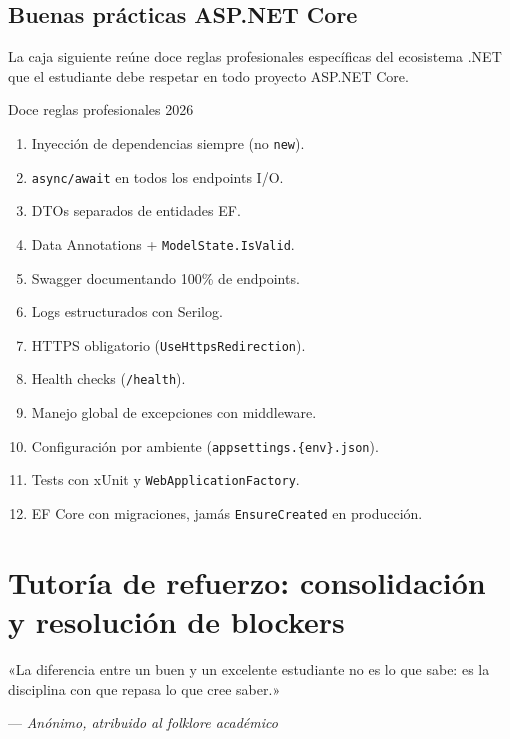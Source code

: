 \documentclass[11pt,a4paper,openany]{book}
\begin{document}
\section{Buenas prácticas ASP.NET Core}

La caja siguiente reúne doce reglas profesionales específicas
del ecosistema .NET que el estudiante debe respetar en todo
proyecto ASP.NET Core.


\begin{cajabuenas}{Doce reglas profesionales 2026}
\begin{enumerate}
\item Inyección de dependencias siempre (no \texttt{new}).
\item \texttt{async/await} en todos los endpoints I/O.
\item DTOs separados de entidades EF.
\item Data Annotations + \texttt{ModelState.IsValid}.
\item Swagger documentando 100\% de endpoints.
\item Logs estructurados con Serilog.
\item HTTPS obligatorio (\texttt{UseHttpsRedirection}).
\item Health checks (\texttt{/health}).
\item Manejo global de excepciones con middleware.
\item Configuración por ambiente (\texttt{appsettings.\{env\}.json}).
\item Tests con xUnit y \texttt{WebApplicationFactory}.
\item EF Core con migraciones, jamás
\texttt{EnsureCreated} en producción.
\end{enumerate}
\end{cajabuenas}


\chapter{Tutoría de refuerzo: consolidación y resolución de blockers}
\label{cap:semana8}

\epigraph{«La diferencia entre un buen y un excelente estudiante no
es lo que sabe: es la disciplina con que repasa lo que cree saber.»}
{--- \textit{Anónimo, atribuido al folklore académico}}
\end{document}

